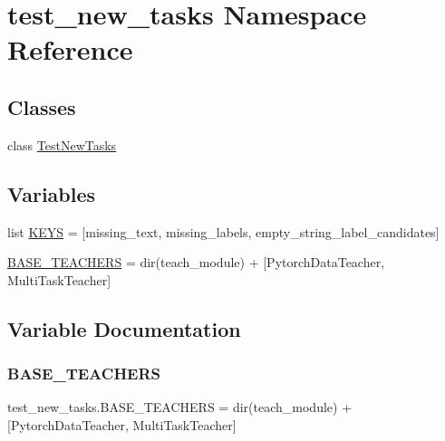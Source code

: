 \hypertarget{namespacetest__new__tasks}{}\section{test\+\_\+new\+\_\+tasks Namespace Reference}
\label{namespacetest__new__tasks}
\subsection*{Classes}
\begin{DoxyCompactItemize}
\item 
class \hyperlink{classtest__new__tasks_1_1TestNewTasks}{Test\+New\+Tasks}
\end{DoxyCompactItemize}
\subsection*{Variables}
\begin{DoxyCompactItemize}
\item 
list \hyperlink{namespacetest__new__tasks_a78b0338511b7541b8771ad9d6c223fb7}{K\+E\+YS} = \mbox{[}\textquotesingle{}missing\+\_\+text\textquotesingle{}, \textquotesingle{}missing\+\_\+labels\textquotesingle{}, \textquotesingle{}empty\+\_\+string\+\_\+label\+\_\+candidates\textquotesingle{}\mbox{]}
\item 
\hyperlink{namespacetest__new__tasks_a31c7cb948ec33fba2b271b92281bab47}{B\+A\+S\+E\+\_\+\+T\+E\+A\+C\+H\+E\+RS} = dir(teach\+\_\+module) + \mbox{[}\textquotesingle{}Pytorch\+Data\+Teacher\textquotesingle{}, \textquotesingle{}Multi\+Task\+Teacher\textquotesingle{}\mbox{]}
\end{DoxyCompactItemize}


\subsection{Variable Documentation}
\mbox{\label{namespacetest__new__tasks_a31c7cb948ec33fba2b271b92281bab47}} 
\subsubsection{\texorpdfstring{B\+A\+S\+E\+\_\+\+T\+E\+A\+C\+H\+E\+RS}{BASE\_TEACHERS}}
{\footnotesize\ttfamily test\+\_\+new\+\_\+tasks.\+B\+A\+S\+E\+\_\+\+T\+E\+A\+C\+H\+E\+RS = dir(teach\+\_\+module) + \mbox{[}\textquotesingle{}Pytorch\+Data\+Teacher\textquotesingle{}, \textquotesingle{}Multi\+Task\+Teacher\textquotesingle{}\mbox{]}}

